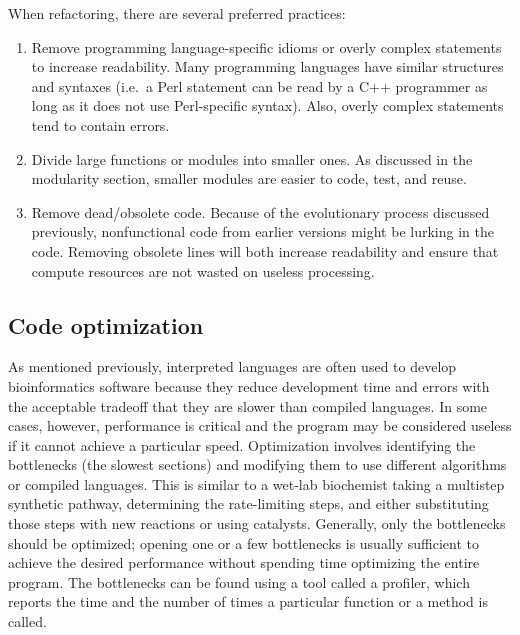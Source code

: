 \documentclass[ChapterTOCs,krantz2]{krantz} %
\begin{document}
When refactoring, there are several preferred practices:  
\begin{enumerate}

\item Remove programming
language-specific idioms or overly complex statements to increase readability.
Many programming languages have similar structures and syntaxes (i.e.\ a Perl
statement can be read by a C++ programmer as long as it does not
use Perl-specific syntax).  Also, overly complex statements 
tend to contain errors.  

\item Divide large
functions or modules into smaller ones.  As discussed in the
modularity section, smaller modules are easier to code, test, and reuse.  

\item Remove dead/obsolete code.  Because of the evolutionary process 
discussed previously,
nonfunctional code from earlier versions might be lurking in the code.
Removing obsolete lines will both increase readability and ensure that compute
resources are not wasted on useless processing.
\end{enumerate}

\subsection{Code optimization}

As mentioned previously, interpreted
languages are often used to develop bioinformatics software because they
reduce development time and errors with the acceptable tradeoff that they are
slower than compiled languages. In some cases, however, performance is critical
and the program may be considered useless if it cannot achieve a particular
speed.  
Optimization involves identifying the bottlenecks (the slowest
sections) and modifying them to use different algorithms or
compiled languages.  This is similar to a wet-lab biochemist taking a multistep
synthetic pathway, determining the rate-limiting steps, and either
substituting those steps with new reactions or using catalysts.  Generally, 
only the
bottlenecks should be optimized; opening one or a few bottlenecks is usually
sufficient to achieve the desired performance without spending time optimizing
the entire program.  The bottlenecks can be found using a tool called a profiler,
which reports the time and the number of times a particular
function or a method is called.
\end{document}
